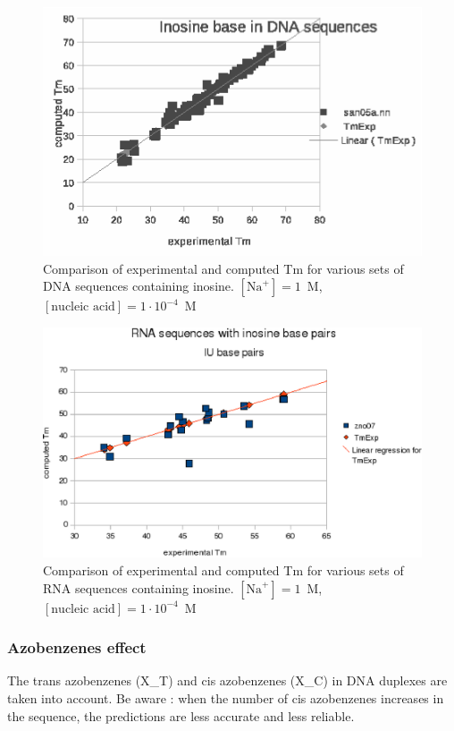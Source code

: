 \documentclass{article}
\begin{document}
\begin{figure}[h]
\includegraphics{images/DNAInosine.eps}
\caption{Comparison of experimental and computed Tm for various sets of
 DNA sequences containing inosine. $[\mbox{Na}^+] = 1$~M, $[\mbox{nucleic acid}] = 1\cdot{}10^{-4}$~M}
\end{figure}

\begin{figure}[h]
\includegraphics{images/RNAInosine.eps}
\caption{Comparison of experimental and computed Tm for various sets of
 RNA sequences containing inosine. $[\mbox{Na}^+] = 1$~M, $[\mbox{nucleic acid}] = 1\cdot{}10^{-4}$~M}
\end{figure}

\subsubsection{Azobenzenes effect}

The trans azobenzenes (X\_T) and cis azobenzenes (X\_C) in DNA duplexes are taken 
into account. Be aware : when the number of cis azobenzenes increases in the sequence, 
the predictions are less accurate and less reliable.
\end{document}
